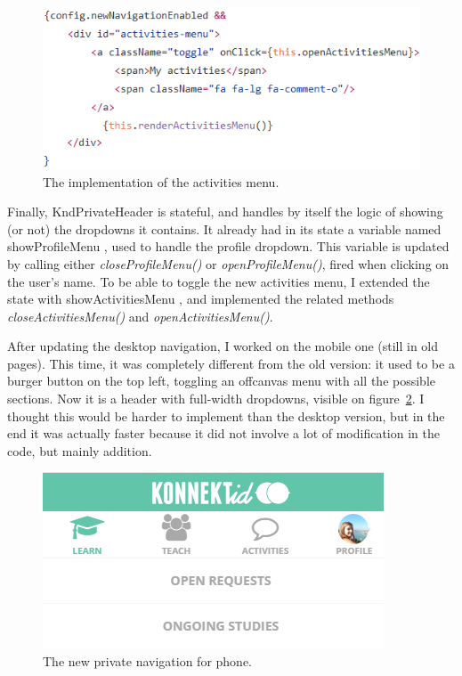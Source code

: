 \begin{figure}[H]
    \centering
    \includegraphics[scale=0.9]{figure/activitiesImpl.png}
    \caption{The implementation of the activities menu.}
    \label{fig:activitiesImpl}
\end{figure}

Finally, \guillemotleft{} KndPrivateHeader \guillemotright{} is stateful, and handles by itself the logic of showing (or not) the dropdowns it contains. It already had in its state a variable named \guillemotleft{} showProfileMenu \guillemotright{}, used to handle the profile dropdown. This variable is updated by calling either \textit{closeProfileMenu()} or \textit{openProfileMenu()}, fired when clicking on the user's name. To be able to toggle the new activities menu, I extended the state with \guillemotleft{} showActivitiesMenu \guillemotright{}, and implemented the related methods \textit{closeActivitiesMenu()} and \textit{openActivitiesMenu()}.

After updating the desktop navigation, I worked on the mobile one (still in old pages). This time, it was completely different from the old version: it used to be a burger button on the top left, toggling an offcanvas menu with all the possible sections. Now it is a header with full-width dropdowns, visible on {\sc figure}~\ref{fig:newNavPhone}. I thought this would be harder to implement than the desktop version, but in the end it was actually faster because it did not involve a lot of modification in the code, but mainly addition.

\begin{figure}[H]
    \centering
    \includegraphics{figure/newNavPhone.png}
    \caption{The new private navigation for phone.}
    \label{fig:newNavPhone}
\end{figure}

